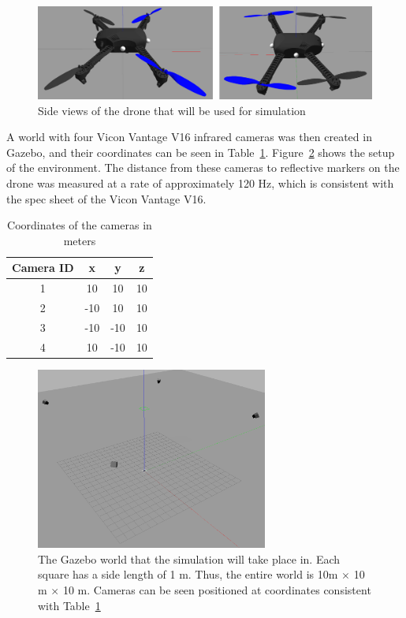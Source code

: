 \documentclass[letterpaper, paper,11pt]{AAS}	%
\begin{document}
\begin{figure}[htb]
	\centering\includegraphics[width=5in]{Figures/DroneModel}
	\caption{Side views of the drone that will be used for simulation}
	\label{fig:DroneModel}
\end{figure}


A world with four Vicon Vantage V16 infrared cameras was then created in Gazebo, and their coordinates can be seen in Table~\ref{tab:cameras}. Figure~\ref{fig:GazeboWorld} shows the setup of the environment. The distance from these cameras to reflective markers on the drone was measured at a rate of approximately 120 Hz, which is consistent with the spec sheet of the Vicon Vantage V16\cite{V16}.

\begin{table}[htbp]
	\fontsize{10}{10}\selectfont
    \caption{Coordinates of the cameras in meters}
   \label{tab:cameras}
        \centering 
   \begin{tabular}{c | c | c | c} %
      \hline 
      Camera ID    & x & y & z \\
      \hline 
      1      & 10 & 10 & 10 \\
      2      & -10 & 10 & 10 \\
      3      & -10 & -10 & 10 \\
      4      & 10 & -10 & 10 \\
      \hline
   \end{tabular}
\end{table}

\begin{figure}[htb]
	\centering\includegraphics[width=3in]{Figures/GazeboWorld}
	\caption{The Gazebo world that the simulation will take place in. Each square has a side length of 1 m. Thus, the entire world is 10m $\times$ 10 m $\times$ 10 m. Cameras can be seen positioned at coordinates consistent with Table~\ref{tab:cameras}}
	\label{fig:GazeboWorld}
\end{figure}
\end{document}
